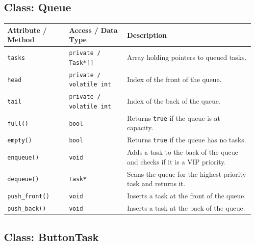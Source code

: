 \documentclass[12pt]{article}
\begin{document}
\subsection*{Class: Queue}

\begin{longtable}{P{3.5cm} P{3.5cm} P{7cm}}
\toprule
\textbf{Attribute / Method} & \textbf{Access / Data Type} & \textbf{Description} \\
\midrule
\endhead

\texttt{tasks}      & \texttt{private / Task*[]}        & Array holding pointers to queued tasks. \\
\texttt{head}       & \texttt{private / volatile int}   & Index of the front of the queue. \\
\texttt{tail}       & \texttt{private / volatile int}   & Index of the back of the queue. \\
\texttt{full()}     & \texttt{bool}                     & Returns \texttt{true} if the queue is at capacity. \\
\texttt{empty()}    & \texttt{bool}                     & Returns \texttt{true} if the queue has no tasks. \\
\texttt{enqueue()}  & \texttt{void}                     & Adds a task to the back of the queue and checks if it is a VIP priority. \\
\texttt{dequeue()}  & \texttt{Task*}                    & Scans the queue for the highest-priority task and returns it. \\
\texttt{push\_front()} & \texttt{void}                  & Inserts a task at the front of the queue. \\
\texttt{push\_back()}  & \texttt{void}                  & Inserts a task at the back of the queue. \\
\bottomrule
\end{longtable}

\subsection*{Class: ButtonTask}
\end{document}
